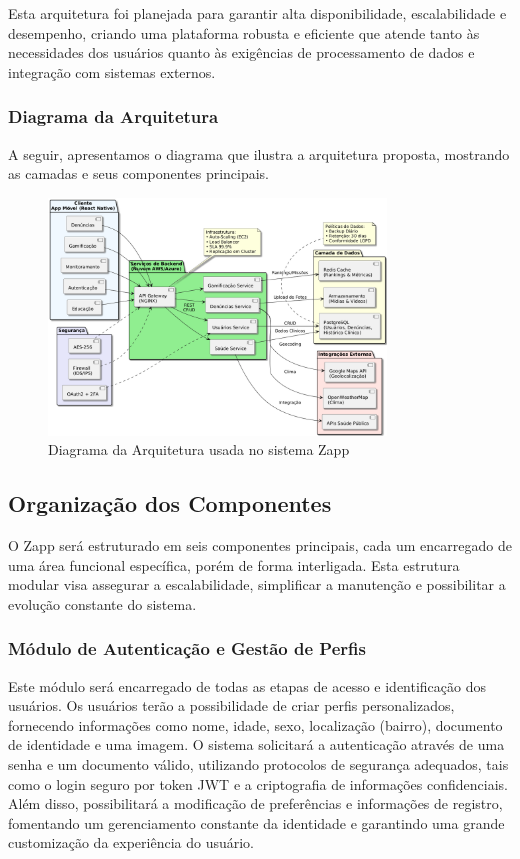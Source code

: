 \documentclass[a4paper, 12pt]{article}
\begin{document}
Esta arquitetura foi planejada para garantir alta disponibilidade, escalabilidade e desempenho, criando uma plataforma robusta e eficiente que atende tanto às necessidades dos usuários quanto às exigências de processamento de dados e integração com sistemas externos.

\subsubsection{Diagrama da Arquitetura}

A seguir, apresentamos o diagrama que ilustra a arquitetura proposta, mostrando as camadas e seus componentes principais.

\begin{figure}[htbp]
    \centering
    \includegraphics[width=0.8\textwidth]{dist/Arquitetura final.png}
    \caption{Diagrama da Arquitetura usada no sistema Zapp}
    \label{fig:arquitetura}
\end{figure}


\subsection{Organização dos Componentes}

O Zapp será estruturado em seis componentes principais, cada um encarregado de uma área funcional específica, porém de forma interligada.  Esta estrutura modular visa assegurar a escalabilidade, simplificar a manutenção e possibilitar a evolução constante do sistema.

\subsubsection{Módulo de Autenticação e Gestão de Perfis}

Este módulo será encarregado de todas as etapas de acesso e identificação dos usuários.  Os usuários terão a possibilidade de criar perfis personalizados, fornecendo informações como nome, idade, sexo, localização (bairro), documento de identidade e uma imagem.  O sistema solicitará a autenticação através de uma senha e um documento válido, utilizando protocolos de segurança adequados, tais como o login seguro por token JWT e a criptografia de informações confidenciais.  Além disso, possibilitará a modificação de preferências e informações de registro, fomentando um gerenciamento constante da identidade e garantindo uma grande customização da experiência do usuário.
\end{document}
